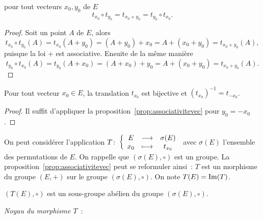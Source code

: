 \begin{prop}\label{prop:associativitevec}
  pour tout vecteurs \(x_0, y_0\) de \(E\)
  \begin{equation}
    t_{x_0} \circ t_{y_0} = t_{x_0 +y_0} = t_{y_0} \circ t_{x_0}.
  \end{equation}
\end{prop}
\begin{proof}
  Soit un point \(A\) de \(E\), alors
  \begin{equation}
    t_{x_0} \circ t_{y_0} (A)=t_{x_0}(A+y_0) = (A+y_0)+x_0 = A+(x_0+y_0) 
    =t_{x_0+y_0}(A),
  \end{equation}
  puisque la loi \(+\) est associative. Ensuite de la même manière
  \begin{equation}
    t_{y_0} \circ t_{x_0} (A)=t_{y_0}(A+x_0) = (A+x_0)+y_0 = 
    A+(x_0+y_0) = t_{x_0+y_0}(A).
  \end{equation}
\end{proof}

\begin{prop}
  Pour tout vecteur \(x_0 \in E\), la translation \(t_{x_0}\) est bijective et 
  \((t_{x_0})^{-1} = t_{{-x}_0}\).
\end{prop}
\begin{proof}
  Il suffit d'appliquer la proposition~\ref{prop:associativitevec} pour \(y_0=-x_0\).
\end{proof}

On peut considérer l'application \(T\colon\left\{\begin{array}{ccc}E & \longrightarrow &\sigma(E)\\x_0 & \longmapsto & t_{x_0}\end{array}\right.\) 
avec \(\sigma(E)\) l'ensemble des permutations de \(E\). On rappelle que 
\((\sigma(E),\circ)\) est un groupe. La proposition~\ref{prop:associativitevec}
peut se reformuler ainsi~: \(T\) est un morphisme du 
groupe \((E,+)\) sur le groupe \((\sigma(E),\circ)\). On note 
\(T(E)=\operatorname{Im}(T)\).

\begin{prop}
  \((T(E),\circ)\) est un sous-groupe abélien du groupe \((\sigma(E),\circ)\).
\end{prop}

\emph{Noyau du morphisme \(T\)}~:

